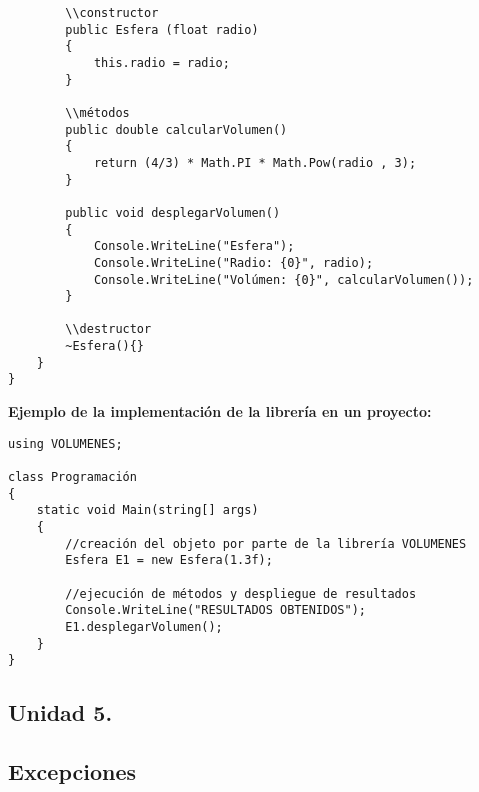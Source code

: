 \documentclass[letterpaper, 12pt]{article}
\begin{document}
\begin{justify}
\begin{verbatim}
        \\constructor
        public Esfera (float radio)
        {
            this.radio = radio;
        }

        \\métodos
        public double calcularVolumen()
        {
            return (4/3) * Math.PI * Math.Pow(radio , 3);
        }

        public void desplegarVolumen()
        {
            Console.WriteLine("Esfera");
            Console.WriteLine("Radio: {0}", radio);
            Console.WriteLine("Volúmen: {0}", calcularVolumen());
        }

        \\destructor
        ~Esfera(){}
    }
}
                \end{verbatim}
            \textbf{Ejemplo de la implementación de la librería en un proyecto:}
                \begin{verbatim}
using VOLUMENES;

class Programación
{
    static void Main(string[] args)
    {
        //creación del objeto por parte de la librería VOLUMENES
        Esfera E1 = new Esfera(1.3f);

        //ejecución de métodos y despliegue de resultados
        Console.WriteLine("RESULTADOS OBTENIDOS");
        E1.desplegarVolumen();
    }
}
                \end{verbatim}
    \end{justify}

    \newpage
        \justify
        \begin{huge}
            \bigbreak
            \bigbreak
            \bigbreak
            \section*{\huge{Unidad 5.}}
            \subsection*{\huge{Excepciones}}
        \end{huge}    
\end{document}
